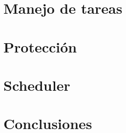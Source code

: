 \documentclass[10pt, a4paper]{article}
\begin{document}
	\section{Manejo de tareas}
		
	\clearpage


	\section{Protección}
		
	\clearpage

	\section{Scheduler}
		
	\clearpage

	\section{Conclusiones}
		
\end{document}
